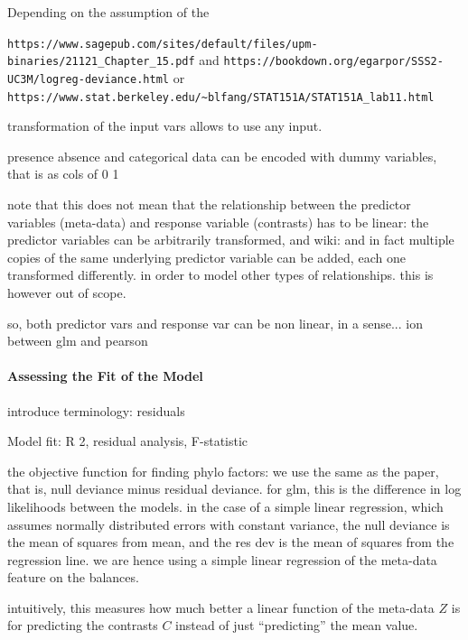 Depending on the assumption of the

 \verb|https://www.sagepub.com/sites/default/files/upm-binaries/21121_Chapter_15.pdf|
and \verb|https://bookdown.org/egarpor/SSS2-UC3M/logreg-deviance.html|
or \verb|https://www.stat.berkeley.edu/~blfang/STAT151A/STAT151A_lab11.html|


transformation of the input vars allows to use any input.

presence absence and categorical data can be encoded with dummy variables, that is as cols of 0 1

note that this does not mean that the relationship between the predictor variables (meta-data) and response variable (contrasts) has to be linear:
the predictor variables can be arbitrarily transformed, and
wiki:
and in fact multiple copies of the same underlying predictor variable can be added, each one transformed differently.
in order to model other types of relationships.
this is however out of scope.

so, both predictor vars and response var can be non linear, in a sense...
ion between glm and pearson


\paragraph{Assessing the Fit of the Model}
\label{sec:Factorization:sub:Methods:sub:GLMs:par:Fitness}

introduce terminology: residuals

Model fit: R 2, residual analysis, F-statistic

the objective function for finding phylo factors:
we use the same as the paper, that is, null deviance minus residual deviance.
for glm, this is the difference in log likelihoods between the models.
in the case of a simple linear regression, which assumes normally distributed errors with constant variance,
the null deviance is the mean of squares from mean,
and the res dev is the mean of squares from the regression line.
we are hence using a simple linear regression of the meta-data feature on the balances.

intuitively, this measures how much better a linear function of the meta-data $Z$ is
for predicting the contrasts $C$ instead of just ``predicting'' the mean value.

